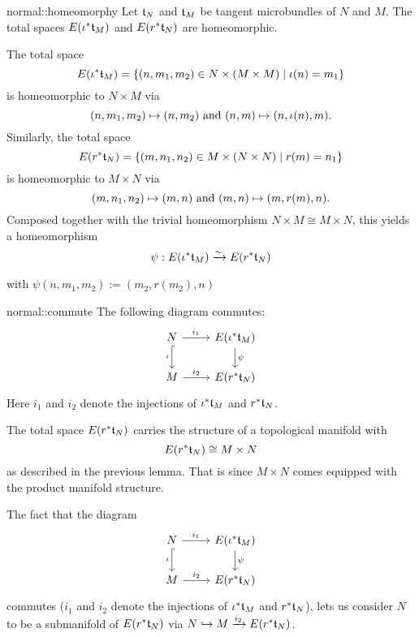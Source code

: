 \begin{mylemma}{normal::homeomorphy}
    Let $\mathfrak{t}_N$ and $\mathfrak{t}_M$ be tangent microbundles of $N$ and $M$.
    The total spaces $E(\iota^*\mathfrak{t}_M)$ and $E(r^*\mathfrak{t}_N)$ are homeomorphic.
\end{mylemma}

\begin{myproof}
    The total space
    \[ E(\iota^*\mathfrak{t}_M) = \{ (n, m_1, m_2) \in N \times (M \times M) \mid \iota(n) = m_1\} \]
    is homeomorphic to $N \times M$ via
    \[ (n, m_1, m_2) \mapsto (n, m_2) \text{ and } (n, m) \mapsto (n, \iota(n), m). \]
    Similarly, the total space
    \[ E(r^*\mathfrak{t}_N) = \{ (m, n_1, n_2) \in M \times (N \times N) \mid r(m) = n_1\} \]
    is homeomorphic to $M \times N$ via
    \[ (m, n_1, n_2) \mapsto (m, n) \text{ and } (m, n) \mapsto (m, r(m), n). \]
    Composed together with the trivial homeomorphism $N \times M \cong M \times N$, this yields a homeomorphism
    \[ \psi: E(\iota^*\mathfrak{t}_M) \xrightarrow{\sim} E(r^*\mathfrak{t}_N) \]
    \begin{center}
        with $\psi(n, m_1, m_2) := (m_2, r(m_2), n)$
    \end{center}
\end{myproof}

\begin{myremark}{normal::commute}
    The following diagram commutes:
    \[
        \begin{tikzcd}
            N \ar[r, "i_1"] \ar[hookrightarrow, "\iota"']{d} & E(\iota^*\bt_M) \ar[d, "\psi"] \\
            M \ar[r, "i_2"] & E(r^*\bt_N)
        \end{tikzcd}
    \]
    Here $i_1$ and $i_2$ denote the injections of $\iota^*\mathfrak{t}_M$ and $r^*\mathfrak{t}_N$.
\end{myremark}

\begin{myparagraph}
    The total space $E(r^*\mathfrak{t}_N)$ carries the structure of a topological manifold with
    \[ E(r^*\mathfrak{t}_N) \cong M \times N \]
    as described in the previous lemma.
    That is since $M \times N$ comes equipped with the product manifold structure.

    The fact that the diagram
    \[
        \begin{tikzcd}
            N \ar[r, "i_1"] \ar[hookrightarrow, "\iota"']{d} & E(\iota^*\bt_M) \ar[d, "\psi"] \\
            M \ar[r, "i_2"] & E(r^*\bt_N)
        \end{tikzcd}
    \]
    commutes ($i_1$ and $i_2$ denote the injections of $\iota^*\mathfrak{t}_M$ and $r^*\mathfrak{t}_N$),
    lets us consider $N$ to be a submanifold of $E(r^*\mathfrak{t}_N)$ via $N \hookrightarrow{} M \xrightarrow{i_2} E(r^*\mathfrak{t}_N)$.
\end{myparagraph}

